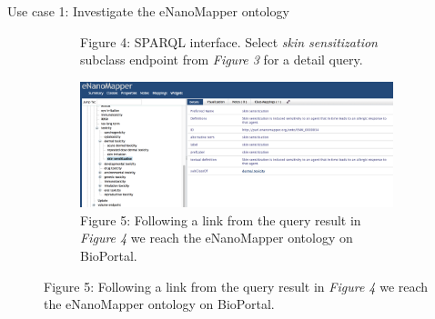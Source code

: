 \documentclass[final]{beamer}
\begin{document}
\begin{frame}{}
\begin{textblock}{62}
\begin{block}{Use case 1: Investigate the eNanoMapper ontology}
\begin{figure}
\begin{subfigure}[c]{0.35\textwidth}
            \caption{Figure 4: SPARQL interface. Select \emph{skin sensitization} subclass endpoint from \emph{Figure 3} for a detail query.}
          \end{subfigure}
          \hspace{0.12\textwidth}
          \begin{subfigure}[c]{0.35\textwidth}
            \includegraphics[scale=0.6,keepaspectratio]{onto-use-case-1d.png}
            \caption{Figure 5: Following a link from the query result in \emph{Figure 4} we reach the eNanoMapper ontology on BioPortal.}
          \end{subfigure}
        \end{figure}
      \end{block}
    \end{textblock}


\end{frame}
\end{document}

